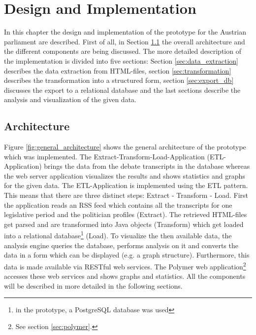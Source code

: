 

\chapter{Design and Implementation}
\label{chap:implementation}

In this chapter the design and implementation of the prototype for the Austrian parliament are described. First of all, in Section \ref{sec:architecture} the overall architecture and the different components are being discussed. The more detailed description of the implementation is divided into five sections: Section \ref{sec:data_extraction} describes the data extraction from HTML-files, section \ref{sec:transformation} describes the transformation into a structured form, section \ref{sec:export_db} discusses the export to a relational database and the last sections describe the analysis and visualization of the given data.


\section{Architecture}
\label{sec:architecture}
Figure \ref{fig:general_architecture} shows the general architecture of the prototype which was implemented. The Extract-Transform-Load-Application (ETL-Application) brings the data from the debate transcripts in the database whereas the web server application visualizes the results and shows statistics and graphs for the given data. The ETL-Application is implemented using the ETL pattern. This means that there are three distinct steps: Extract - Transform - Load. First the application reads an RSS feed which contains all the transcripts for one legislative period and the politician profiles (Extract). The retrieved HTML-files get parsed and are transformed into Java objects (Transform) which get loaded into a relational database\footnote{in the prototype, a PostgreSQL database was used} (Load). To visualize the then available data, the analysis engine queries the database, performs analysis on it and converts the data in a form which can be displayed (e.g. a graph structure). Furthermore, this data is made available via RESTful web services. The Polymer web application\footnote{See section \ref{sec:polymer}.} accesses these web services and shows graphs and statistics. All the components will be described in more detailed in the following sections.

